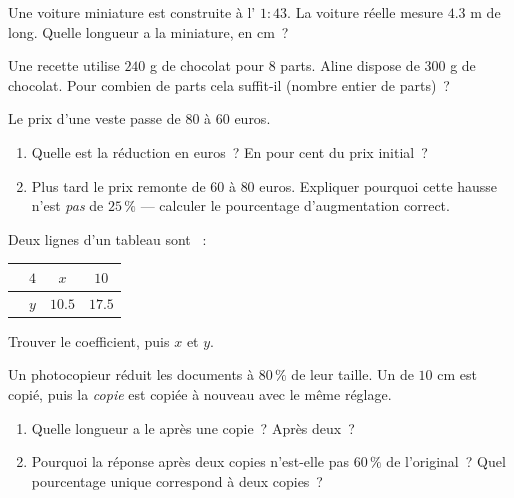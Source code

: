 \begin{exercise}[$\star$]\label{exo:g7:prop:7}
Une voiture miniature est construite à l' $1 : 43$. La
voiture réelle mesure $4.3$ m de long. Quelle longueur a la
miniature, en cm~?
\end{exercise}

\begin{exercise}[$\star\star$]\label{exo:g7:prop:8}
Une recette utilise $240$ g de chocolat pour $8$ parts. Aline dispose
de $300$ g de chocolat. Pour combien de parts cela suffit-il (nombre
entier de parts)~?
\end{exercise}

\begin{exercise}[$\star\star$]\label{exo:g7:prop:9}
Le prix d'une veste passe de $80$ à $60$ euros.
\begin{enumerate}
  \item Quelle est la réduction en euros~? En pour cent du prix
        initial~?
  \item Plus tard le prix remonte de $60$ à $80$ euros. Expliquer
        pourquoi cette hausse n'est \emph{pas} de $25\,\%$ ---
        calculer le pourcentage d'augmentation correct.
\end{enumerate}
\end{exercise}

\begin{exercise}[$\star\star$]\label{exo:g7:prop:10}
Deux lignes d'un tableau sont ~:
\begin{center}
\renewcommand{\arraystretch}{1.2}
\begin{tabular}{l|ccc}
 & $4$ & $x$ & $10$ \\
\hline
 & $y$ & $10.5$ & $17.5$ \\
\end{tabular}
\end{center}
Trouver le coefficient, puis $x$ et $y$.
\end{exercise}

\begin{exercise}[$\star\star\star$]\label{exo:g7:prop:11}
Un photocopieur réduit les documents à $80\,\%$ de leur taille. Un
 de $10$ cm est copié, puis la \emph{copie} est copiée à
nouveau avec le même réglage.
\begin{enumerate}
  \item Quelle longueur a le  après une copie~? Après deux~?
  \item Pourquoi la réponse après deux copies n'est-elle pas $60\,\%$
        de l'original~? Quel pourcentage unique correspond à deux
        copies~?
\end{enumerate}
\end{exercise}

